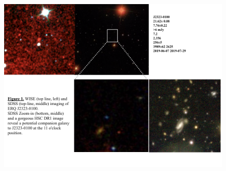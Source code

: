 \hspace{-7.5cm}
\begin{figure}[h]
  \begin{center}
    \hspace{-0.5cm}
    \includegraphics[height=12.0cm,width=16.0cm]{../Figures/WISE_SDSSzoomHSC_ERQ-image.png}
    \vspace{-10pt}
    \caption{
}
    \vspace{-14pt}
    \label{figtest-fig}
  \end{center}
\end{figure}

